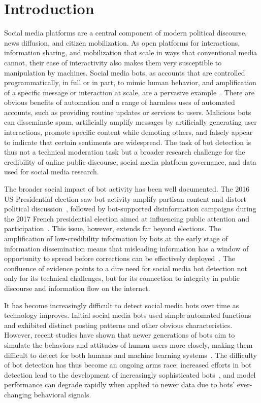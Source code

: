 \section{Introduction}\label{sec:intro}
Social media platforms are a central component of modern political discourse, news diffusion, and citizen mobilization. As open platforms for interactions, information sharing, and mobilization that scale in ways that conventional media cannot, their ease of interactivity also makes them very susceptible to manipulation by machines. Social media bots, as accounts that are controlled programmatically, in full or in part, to mimic human behavior, and amplification of a specific message or interaction at scale, are a pervasive example~\cite{ferrara2016rise}. There are obvious benefits of automation and a range of harmless uses of automated accounts, such as providing routine updates or services to users. Malicious bots can disseminate spam, artificially amplify messages by artificially generating user interactions, promote specific content while demoting others, and falsely appear to indicate that certain sentiments are widespread. The task of bot detection is thus not a technical moderation task but a broader research challenge for the credibility of online public discourse, social media platform governance, and data used for social media research. 

The broader social impact of bot activity has been well documented. The 2016 US Presidential election saw bot activity amplify partisan content and distort political discussion~\cite{bessi2016distort}, followed by bot-supported disinformation campaigns during the 2017 French presidential election aimed at influencing public attention and participation~\cite{ferrara2017french}. This issue, however, extends far beyond elections. The amplification of low-credibility information by bots at the early stage of information dissemination means that misleading information has a window of opportunity to spread before corrections can be effectively deployed~\cite{shao2018spread}. The confluence of evidence points to a dire need for social media bot detection not only for its technical challenges, but for its connection to integrity in public discourse and information flow on the internet. 

It has become increasingly difficult to detect social media bots over time as technology improves. Initial social media bots used simple automated functions and exhibited distinct posting patterns and other obvious characteristics. However, recent studies have shown that newer generations of bots aim to simulate the behaviors and attitudes of human users more closely, making them difficult to detect for both humans and machine learning systems~\cite{cresci2017paradigm}. The difficulty of bot detection has thus become an ongoing arms race: increased efforts in bot detection lead to the development of increasingly sophisticated bots~\cite{cresci2020decade}, and model performance can degrade rapidly when applied to newer data due to bots' ever-changing behavioral signals. 


